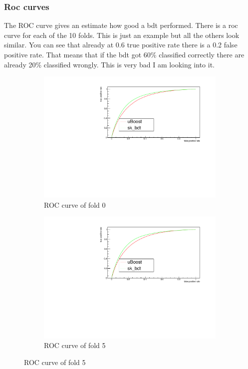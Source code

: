 \documentclass{beamer}
\begin{document}
%
%

\begin{frame}
\frametitle{Roc curves}
The ROC curve gives an estimate how good a bdt performed. There is a roc curve for each of the 10 folds. This is just an example but all the others look similar.
You can see that already at 0.6 true positive rate there is a 0.2 false positive rate. That means that if the bdt got 60\% classified correctly there are already 20\% classified wrongly. This is very bad I am looking into it.
    \begin{figure}
    \centering
    \begin{subfigure}{0.5\textwidth}
    \centering
    \includegraphics[width=1\linewidth]{roc/fold0_roc}
    \caption{ROC curve of fold 0}
    \end{subfigure}%
    \begin{subfigure}{0.5\textwidth}
    \centering
    \includegraphics[width=1\linewidth]{roc/fold5_roc}
    \caption{ROC curve of fold 5}
    \end{subfigure}
    \end{figure}

\end{frame}
\end{document}
